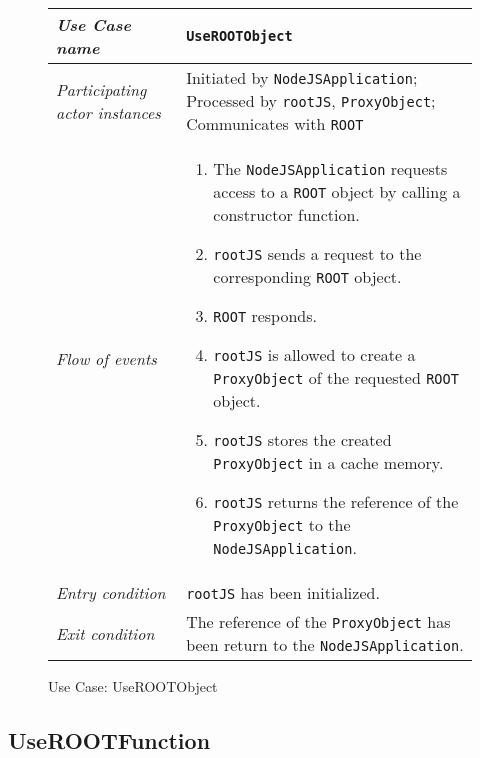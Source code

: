 \begin{figure}[htb]
	\centering
	\begin{longtable}{p{3cm} @{\hskip 1cm} p{12cm}}
		\hline
		
		\textit{Use Case name} & \texttt{UseROOTObject}\\
		\hline
		
		\textit{Participating actor instances} & 
		Initiated by \texttt{NodeJSApplication}; Processed by \texttt{rootJS}, \texttt{ProxyObject}; Communicates with \texttt{ROOT}\\
		\hline
		
		\textit{Flow of events} &
			\begin{enumerate}
				\item The \texttt{NodeJSApplication} requests access to a \texttt{ROOT} object by calling a constructor function.
				\item \texttt{rootJS} sends a request to the corresponding \texttt{ROOT} object.
				\item \texttt{ROOT} responds.
				\item \texttt{rootJS} is allowed to create a \texttt{ProxyObject} of the requested \texttt{ROOT} object.
				\item \texttt{rootJS} stores the created \texttt{ProxyObject} in a cache memory.
				\item \texttt{rootJS} returns the reference of the \texttt{ProxyObject} to the \texttt{NodeJSApplication}.
			\end{enumerate}
			\\
		\hline
		
		\textit{Entry condition} & \texttt{rootJS} has been initialized.\\
		\hline
		
		\textit{Exit condition} & The reference of the \texttt{ProxyObject} has been return to the \texttt{NodeJSApplication}.\\
        \hline
	\end{longtable}
	
	\caption{Use Case: UseROOTObject}
\end{figure}

\pagebreak

\subsection{UseROOTFunction}

